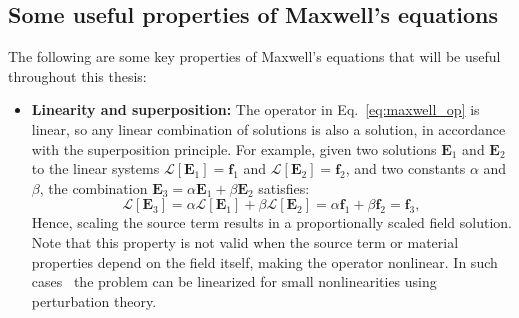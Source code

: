     \subsection*{Some useful properties of Maxwell's equations}
    The following are some key properties of Maxwell's equations that will be
    useful throughout this thesis:
    \begin{itemize}
        \item \textbf{Linearity and superposition:} The operator in
              Eq.~\eqref{eq:maxwell_op} is linear, so any linear combination of solutions is
              also a solution, in accordance with the superposition principle.
              For example, given two solutions $\mathbf{E}_1$ and $\mathbf{E}_2$ to the
              linear systems $\mathcal{L}[\mathbf{E}_1] = \mathbf{f}_1$ and
              $\mathcal{L}[\mathbf{E}_2] = \mathbf{f}_2$,
              and two constants $\alpha$ and $\beta$, the combination $\mathbf{E}_3 =
                  \alpha \mathbf{E}_1 + \beta \mathbf{E}_2$ satisfies:
              \begin{equation}
                  \mathcal{L}[\mathbf{E}_3] = \alpha \mathcal{L}[\mathbf{E}_1] + \beta
                  \mathcal{L}[\mathbf{E}_2] = \alpha \mathbf{f}_1 + \beta \mathbf{f}_2 =
                  \mathbf{f}_3,
              \end{equation}
              Hence, scaling the source term results in a proportionally scaled field
              solution. Note that this property is not valid when the source term or material
              properties depend on the field itself, making the operator nonlinear. In such
              cases~\cite{ownpub4} the problem can be linearized for small nonlinearities
              using perturbation theory.


\end{itemize}
